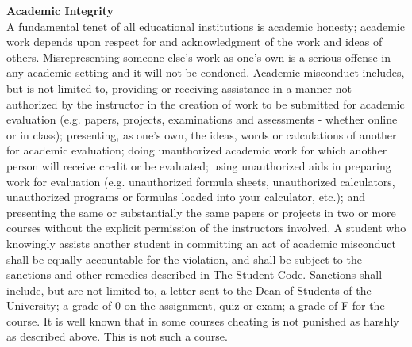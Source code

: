 \documentclass [11pt]{article}
\begin{document}
   {\bf Academic Integrity}\\
   A fundamental tenet of all educational institutions is academic
   honesty; academic work depends upon respect for and acknowledgment of
   the work and ideas of others. Misrepresenting someone else's work as
   one's own is a serious offense in any academic setting and it will not
   be condoned.
   Academic misconduct includes, but is not limited to, providing or
   receiving assistance in a manner not authorized by the instructor in
   the creation of work to be submitted for academic evaluation (e.g.
   papers, projects, examinations and assessments - whether online or in
   class); presenting, as one's own, the ideas, words or calculations of
   another for academic evaluation; doing unauthorized academic work for
   which another person will receive credit or be evaluated; using
   unauthorized aids in preparing work for evaluation (e.g. unauthorized
   formula sheets, unauthorized calculators, unauthorized programs or
   formulas loaded into your calculator, etc.); and presenting the same
   or substantially the same papers or projects in two or more courses
   without the explicit permission of the instructors involved.
   A student who knowingly assists another student in committing an act
   of academic misconduct shall be equally accountable for the violation,
   and shall be subject to the sanctions and other remedies described in
   The Student Code. Sanctions shall include, but are not limited to, a
   letter sent to the Dean of Students of the University; a grade of 0 on
   the assignment, quiz or exam; a grade of F for the course.
   It is well known that in some courses cheating is not punished as
   harshly as described above. This is not such a course.\\
   \ \\
   
\end{document}
